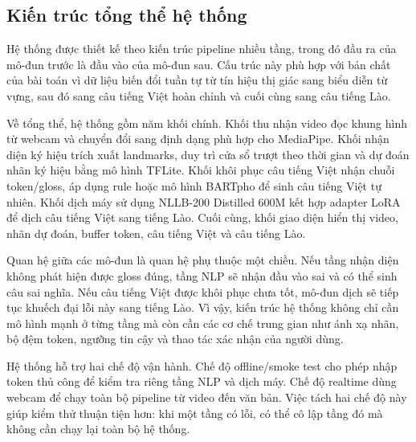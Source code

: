 ﻿\subsection{Kiến trúc tổng thể hệ thống}

Hệ thống được thiết kế theo kiến trúc pipeline nhiều tầng, trong đó đầu ra của mô-đun trước là đầu vào của mô-đun sau. Cấu trúc này phù hợp với bản chất của bài toán vì dữ liệu biến đổi tuần tự từ tín hiệu thị giác sang biểu diễn từ vựng, sau đó sang câu tiếng Việt hoàn chỉnh và cuối cùng sang câu tiếng Lào.

Về tổng thể, hệ thống gồm năm khối chính. Khối thu nhận video đọc khung hình từ webcam và chuyển đổi sang định dạng phù hợp cho MediaPipe. Khối nhận diện ký hiệu trích xuất landmarks, duy trì cửa sổ trượt theo thời gian và dự đoán nhãn ký hiệu bằng mô hình TFLite. Khối khôi phục câu tiếng Việt nhận chuỗi token/gloss, áp dụng rule hoặc mô hình BARTpho để sinh câu tiếng Việt tự nhiên. Khối dịch máy sử dụng NLLB-200 Distilled 600M kết hợp adapter LoRA để dịch câu tiếng Việt sang tiếng Lào. Cuối cùng, khối giao diện hiển thị video, nhãn dự đoán, buffer token, câu tiếng Việt và câu tiếng Lào.

Quan hệ giữa các mô-đun là quan hệ phụ thuộc một chiều. Nếu tầng nhận diện không phát hiện được gloss đúng, tầng NLP sẽ nhận đầu vào sai và có thể sinh câu sai nghĩa. Nếu câu tiếng Việt được khôi phục chưa tốt, mô-đun dịch sẽ tiếp tục khuếch đại lỗi này sang tiếng Lào. Vì vậy, kiến trúc hệ thống không chỉ cần mô hình mạnh ở từng tầng mà còn cần các cơ chế trung gian như ánh xạ nhãn, bộ đệm token, ngưỡng tin cậy và thao tác xác nhận của người dùng.

Hệ thống hỗ trợ hai chế độ vận hành. Chế độ offline/smoke test cho phép nhập token thủ công để kiểm tra riêng tầng NLP và dịch máy. Chế độ realtime dùng webcam để chạy toàn bộ pipeline từ video đến văn bản. Việc tách hai chế độ này giúp kiểm thử thuận tiện hơn: khi một tầng có lỗi, có thể cô lập tầng đó mà không cần chạy lại toàn bộ hệ thống.

